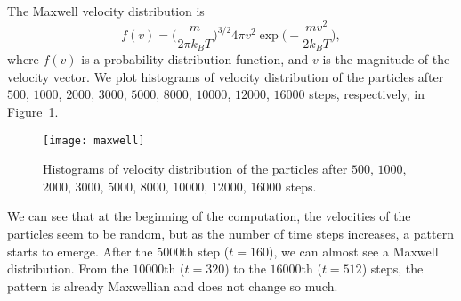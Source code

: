 The Maxwell velocity distribution is
%
\begin{equation}
    f(v) = \biggl( \frac{m}{2\pi k_B T} \biggr)^{3/2}
    4\pi v^2 \exp{\biggl( -\frac{m v^2}{2 k_B T} \biggr)},
\end{equation}
%
where \(f(v)\) is a probability distribution function, and \(v\) is the magnitude of the
velocity vector.
We plot histograms of velocity distribution of the particles after
\(500\), \(1000\), \(2000\), \(3000\), \(5000\), \(8000\), \(10000\), \(12000\), \(16000\) steps,
respectively, in Figure~\ref{fig:maxwell}.
%
\begin{figure}
    \centering
    \texttt{[image: maxwell]}
    \caption{Histograms of velocity distribution of the particles after
        \(500\), \(1000\), \(2000\), \(3000\), \(5000\), \(8000\), \(10000\), \(12000\), \(16000\) steps.}
    \label{fig:maxwell}
\end{figure}
%
We can see that at the beginning of the computation, the velocities of the particles
seem to be random, but as the number of time steps increases, a pattern starts to
emerge. After the \(5000\)th step (\(t = 160\)), we can almost see a Maxwell distribution.
From the \(10000\)th (\(t = 320\)) to the \(16000\)th (\(t = 512\)) steps, the pattern is
already Maxwellian and does not change so much.
